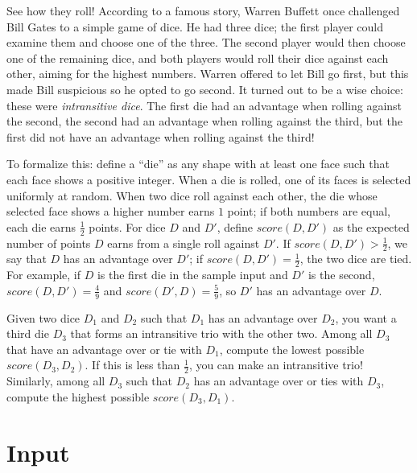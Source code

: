 
\newcommand{\score}[2]{\mbox{$\mathit{score}({#1},{#2})$}}

%
See how they roll!
According to a famous story, Warren Buffett once challenged Bill Gates to a simple game of dice.
He had three dice; the first player could examine them and choose one of the three.
The second player would then choose one of the remaining dice, and both players would roll their dice against each other, aiming for the highest numbers.
Warren offered to let Bill go first, but this made Bill suspicious so he opted to go second.
It turned out to be a wise choice: these were \emph{intransitive dice}.
The first die had an advantage when rolling against the second, the second had an advantage when rolling against the third, but the first did not have an advantage when rolling against the third!

To formalize this: define a ``die'' as any shape with at least one face such that each face shows a positive integer.
When a die is rolled, one of its faces is selected uniformly at random.
When two dice roll against each other, the die whose selected face shows a higher number earns $1$ point; if both numbers are equal, each die earns $\frac{1}{2}$ points.
For dice $D$ and $D'$, define $\score{D}{D'}$ as the expected number of points $D$ earns from a single roll against $D'$.
If $\score{D}{D'} > \frac{1}{2}$, we say that $D$ has an advantage over $D'$; if $\score{D}{D'} = \frac{1}{2}$, the two dice are tied.
For example, if $D$ is the first die in the sample input and $D'$ is the second, $\score{D}{D'} = \frac{4}{9}$ and $\score{D'}{D} = \frac{5}{9}$, so $D'$ has an advantage over $D$.

Given two dice $D_1$ and $D_2$ such that $D_1$ has an advantage over $D_2$, you want a third die $D_3$ that forms an intransitive trio with the other two.
Among all $D_3$ that have an advantage over or tie with $D_1$, compute the lowest possible $\score{D_3}{D_2}$.
If this is less than $\frac{1}{2}$, you can make an intransitive trio!
Similarly, among all $D_3$ such that $D_2$ has an advantage over or ties with $D_3$, compute the highest possible $\score{D_3}{D_1}$.

\section*{Input}

